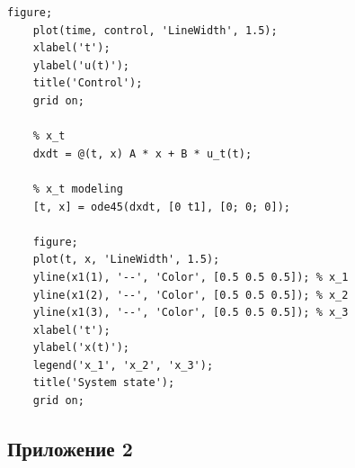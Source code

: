 \documentclass[a4paper, 12pt]{article}
\begin{document}
\begin{lstlisting}[label=task1, caption={Программа для первого задания}]
    figure;
    plot(time, control, 'LineWidth', 1.5);
    xlabel('t');
    ylabel('u(t)');
    title('Control');
    grid on;

    % x_t
    dxdt = @(t, x) A * x + B * u_t(t);

    % x_t modeling
    [t, x] = ode45(dxdt, [0 t1], [0; 0; 0]);

    figure;
    plot(t, x, 'LineWidth', 1.5);
    yline(x1(1), '--', 'Color', [0.5 0.5 0.5]); % x_1
    yline(x1(2), '--', 'Color', [0.5 0.5 0.5]); % x_2
    yline(x1(3), '--', 'Color', [0.5 0.5 0.5]); % x_3
    xlabel('t');
    ylabel('x(t)');
    legend('x_1', 'x_2', 'x_3');
    title('System state');
    grid on;
    \end{lstlisting}


    \subsection{Приложение 2}
\end{document}
